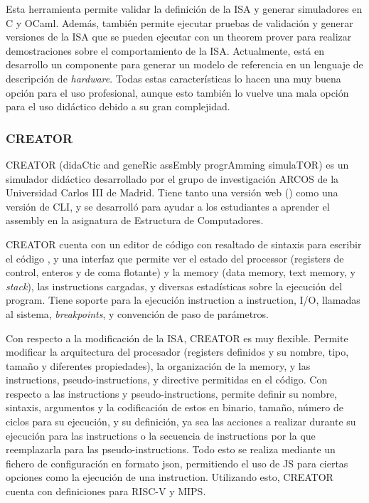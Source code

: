 Esta herramienta permite validar la definición de la \gls{ISA} y generar
simuladores en C y OCaml. Además, también permite ejecutar pruebas de validación
y generar versiones de la \gls{ISA} que se pueden ejecutar con un \gls{theorem
prover} para realizar demostraciones sobre el comportamiento de la \gls{ISA}.
Actualmente, está en desarrollo un componente para generar un modelo de
referencia en un lenguaje de descripción de \textit{hardware}. Todas estas
características lo hacen una muy buena opción para el uso profesional, aunque
esto también lo vuelve una mala opción para el uso didáctico debido a su gran
complejidad.

\subsubsection{CREATOR}

CREATOR (didaCtic and geneRic assEmbly progrAmming simulaTOR)
\parencite{CREATOR} es un simulador didáctico desarrollado por el grupo de
investigación ARCOS de la Universidad Carlos III de Madrid. Tiene tanto una
versión web () como una versión de \gls{CLI}, y se desarrolló
para ayudar a los estudiantes a aprender el \gls{assembly} en la asignatura de
Estructura de Computadores.

CREATOR cuenta con un editor de código con resaltado de sintaxis para escribir
el código , y una interfaz que permite ver el
estado del \gls{processor} (\glspl{register} de control, enteros y de coma
flotante) y la \gls{memory} (\gls{data memory}, \gls{text memory}, y
\textit{stack}), las \glspl{instruction} cargadas, y diversas estadísticas sobre
la ejecución del \gls{program}. Tiene soporte para la ejecución
\gls{instruction} a \gls{instruction}, I/O, llamadas al sistema,
\textit{breakpoints}, y convención de paso de parámetros.

Con respecto a la modificación de la \gls{ISA}, CREATOR es muy flexible. Permite
modificar la arquitectura del procesador (\glspl{register} definidos y su
nombre, tipo, tamaño y diferentes propiedades), la organización de la
\gls{memory}, y las \glspl{instruction}, \glspl{pseudo-instruction}, y
\gls{directive} permitidas en el código. Con respecto a las \glspl{instruction}
y \glspl{pseudo-instruction}, permite definir su nombre, sintaxis, argumentos y
la codificación de estos en binario, tamaño, número de ciclos para su ejecución,
y su definición, ya sea las acciones a realizar durante su ejecución para las
\glspl{instruction} o la secuencia de \glspl{instruction} por la que
reemplazarla para las \glspl{pseudo-instruction}. Todo esto se realiza mediante
un fichero de configuración en formato \gls{json}, permitiendo el uso de
\gls{JS} para ciertas opciones como la ejecución de una \gls{instruction}.
Utilizando esto, CREATOR cuenta con definiciones para RISC-V y MIPS.

